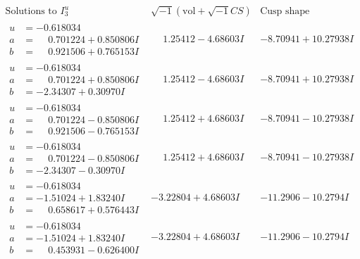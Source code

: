 \documentclass[1p]{elsarticle_modified}
\theoremstyle{definition}
\newcommand{\I}{\sqrt{-1}}
\begin{document}
$$\begin{array}{c|c|c}  
\text{Solutions to }I^u_{3}& \I (\text{vol} + \sqrt{-1}CS) & \text{Cusp shape}\\
 \hline 
\begin{aligned}
u &= -0.618034\phantom{ +0.000000I} \\
a &= \phantom{-}0.701224 + 0.850806 I \\
b &= \phantom{-}0.921506 + 0.765153 I\end{aligned}
 & \phantom{-}1.25412 - 4.68603 I & -8.70941 + 10.27938 I \\ \hline\begin{aligned}
u &= -0.618034\phantom{ +0.000000I} \\
a &= \phantom{-}0.701224 + 0.850806 I \\
b &= -2.34307 + 0.30970 I\end{aligned}
 & \phantom{-}1.25412 - 4.68603 I & -8.70941 + 10.27938 I \\ \hline\begin{aligned}
u &= -0.618034\phantom{ +0.000000I} \\
a &= \phantom{-}0.701224 - 0.850806 I \\
b &= \phantom{-}0.921506 - 0.765153 I\end{aligned}
 & \phantom{-}1.25412 + 4.68603 I & -8.70941 - 10.27938 I \\ \hline\begin{aligned}
u &= -0.618034\phantom{ +0.000000I} \\
a &= \phantom{-}0.701224 - 0.850806 I \\
b &= -2.34307 - 0.30970 I\end{aligned}
 & \phantom{-}1.25412 + 4.68603 I & -8.70941 - 10.27938 I \\ \hline\begin{aligned}
u &= -0.618034\phantom{ +0.000000I} \\
a &= -1.51024 + 1.83240 I \\
b &= \phantom{-}0.658617 + 0.576443 I\end{aligned}
 & -3.22804 + 4.68603 I & -11.2906 - 10.2794 I \\ \hline\begin{aligned}
u &= -0.618034\phantom{ +0.000000I} \\
a &= -1.51024 + 1.83240 I \\
b &= \phantom{-}0.453931 - 0.626400 I\end{aligned}
 & -3.22804 + 4.68603 I & -11.2906 - 10.2794 I \\ \hline\begin{aligned}

\end{aligned}
\end{array}$$
\end{document}
